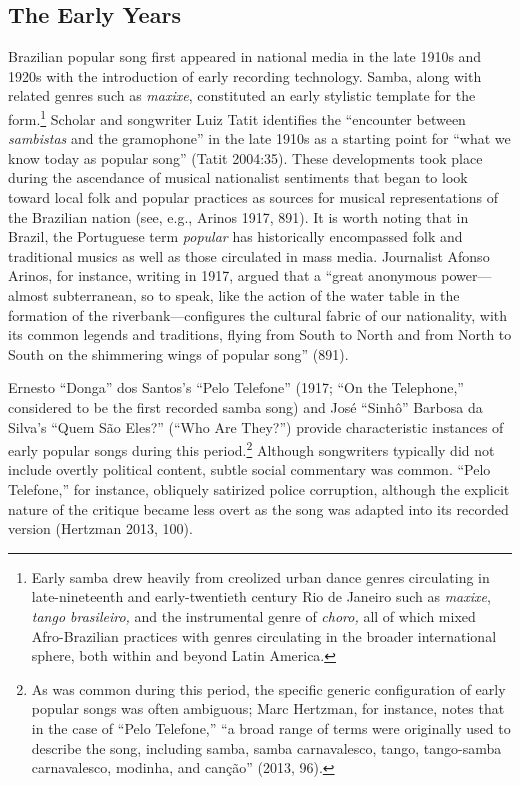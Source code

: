 \documentclass[twoside]{article}
\begin{document}
\hypertarget{the-early-years}{%
\subsection*{The Early Years}\label{the-early-years}}

Brazilian popular song first appeared in national media in the late
1910s and 1920s with the introduction of early recording technology.
Samba, along with related genres such as \emph{maxixe}, constituted an
early stylistic template for the form.\footnote{Early samba drew heavily
  from creolized urban dance genres circulating in late-nineteenth and
  early-twentieth century Rio de Janeiro such as \emph{maxixe},
  \emph{tango brasileiro,} and the instrumental genre of \emph{choro,}
  all of which mixed Afro-Brazilian practices with genres circulating in
  the broader international sphere, both within and beyond Latin
  America.} Scholar and songwriter Luiz Tatit identifies the ``encounter
between \emph{sambistas} and the gramophone'' in the late 1910s as a
starting point for ``what we know today as popular song'' (Tatit
2004:35). These developments took place during the ascendance of musical
nationalist sentiments that began to look toward local folk and popular
practices as sources for musical representations of the Brazilian nation
(see, e.g., Arinos 1917, 891). It is worth noting that in Brazil, the
Portuguese term \emph{popular} has historically encompassed folk and
traditional musics as well as those circulated in mass media. Journalist
Afonso Arinos, for instance, writing in 1917, argued that a ``great
anonymous power---almost subterranean, so to speak, like the action of
the water table in the formation of the riverbank---configures the
cultural fabric of our nationality, with its common legends and
traditions, flying from South to North and from North to South on the
shimmering wings of popular song'' (891).

Ernesto ``Donga'' dos Santos's ``Pelo Telefone'' (1917; ``On the
Telephone,'' considered to be the first recorded samba song) and José
``Sinhô'' Barbosa da Silva's ``Quem São Eles?'' (``Who Are They?'')
provide characteristic instances of early popular songs during this
period.\footnote{As was common during this period, the specific generic
  configuration of early popular songs was often ambiguous; Marc
  Hertzman, for instance, notes that in the case of ``Pelo Telefone,''
  ``a broad range of terms were originally used to describe the song,
  including samba, samba carnavalesco, tango, tango-samba carnavalesco,
  modinha, and canção'' (2013, 96).} Although songwriters typically did
not include overtly political content, subtle social commentary was
common. ``Pelo Telefone,'' for instance, obliquely satirized police
corruption, although the explicit nature of the critique became less
overt as the song was adapted into its recorded version (Hertzman 2013,
100).
\end{document}
